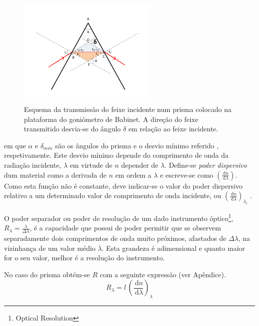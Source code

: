 \documentclass[a4paper,12pt]{article}  %
\newcommand{\ud}{\,\mathrm{d}}
\begin{document}

\begin{figure}[htb]  \centering 
	\includegraphics[width=0.6\textwidth]{desvio}
	\caption{Esquema da transmissão do feixe incidente num prisma colocado na plataforma do goniómetro de Babinet. A direção do feixe transmitido desvia-se do ângulo $\delta$ em relação ao feixe incidente. \label{fig:desvio}} 
\end{figure}


em que $\alpha$ e  $\delta_{min}$ são os ângulos do prisma e o desvio mínimo referido , respetivamente. Este desvio mínimo depende do comprimento de onda da radiação incidente, $\lambda$ em virtude de  $n$ depender de $\lambda$. Define-se \emph{poder dispersivo} dum material como a derivada de $n$ em ordem a $\lambda$   e escreve-se  como $\left( \frac{\ud n}{\ud \lambda } \right)$. Como esta função não é constante, deve indicar-se o valor do poder dispersivo relativo a um determinado valor de comprimento de onda incidente, ou $\left( \frac{\ud n}{\ud \lambda } \right)_{\lambda_i}$ .

O poder separador ou poder de resolução de um dado instrumento óptico\footnote{Optical Resolution}, $R_\lambda = \frac{\lambda}{\Delta \lambda} $,  é a capacidade que possui de poder permitir que se observem separadamente dois comprimentos de onda muito próximos, afastados de $\Delta \lambda$, na vizinhança de um valor médio $\overline{\lambda}$. Esta grandeza é adimensional e quanto maior for o seu valor, melhor é a resolução do instrumento.

No caso do prisma obtém-se  $R$ com a seguinte expressão (ver Apêndice).
 \begin{equation}
	\label{eq:resolu}
	R_\lambda = l\,\left(\frac{\ud n}{\ud \lambda} \right)_\lambda 
\end{equation}
\end{document}
